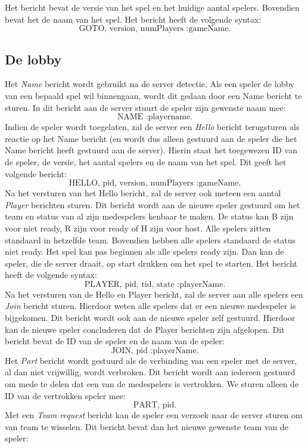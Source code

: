 \documentclass[a4paper,11pt]{article}
\begin{document}
    Het bericht bevat de versie van het spel en het huidige aantal spelers. Bovendien bevat het de naam van het spel. Het bericht heeft de volgende syntax:
    \[
    \text{GOTO, version, numPlayers :gameName.}
    \]

    \subsection{De lobby}
    Het \emph{Name} bericht wordt gebruikt na de server detectie. Als een speler de lobby van een bepaald spel wil binnengaan, wordt dit gedaan door een Name bericht te sturen. In dit bericht aan de server stuurt de speler zijn gewenste naam mee:
    \[
    \text{NAME :playername.}
    \]
    Indien de speler wordt toegelaten, zal de server een \emph{Hello} bericht terugsturen als reactie op het Name bericht (en wordt dus alleen gestuurd aan de speler die het Name bericht heeft gestuurd aan de server). Hierin staat het toegewezen ID van de speler, de versie, het aantal spelers en de naam van het spel. Dit geeft het volgende bericht:
    \[
    \text{HELLO, pid, version, numPlayers :gameName.}
    \]
    Na het versturen van het Hello bericht, zal de server ook meteen een aantal \emph{Player} berichten sturen. Dit bericht wordt aan de nieuwe speler gestuurd om het team en status van al zijn medespelers kenbaar te maken. De status kan B zijn voor niet ready, R zijn voor ready of H zijn voor host. Alle spelers zitten standaard in hetzelfde team. Bovendien hebben alle spelers standaard de status niet ready. Het spel kan pas beginnen als alle spelers ready zijn. Dan kan de speler, die de server draait, op start drukken om het spel te starten. Het bericht heeft de volgende syntax:
    \[
    \text{PLAYER, pid, tid, state :playerName.}
    \]
    Na het versturen van de Hello en Player bericht, zal de server aan alle spelers een \emph{Join} bericht sturen. Hierdoor weten alle spelers dat er een nieuwe medespeler is bijgekomen. Dit bericht wordt ook aan de nieuwe speler zelf gestuurd. Hierdoor kan de nieuwe speler concluderen dat de Player berichten zijn afgelopen. Dit bericht bevat de ID van de speler en de naam van de speler:
    \[
    \text{JOIN, pid :playerName.}
    \]
    Het \emph{Part} bericht wordt gestuurd als de verbinding van een speler met de server, al dan niet vrijwillig, wordt verbroken. Dit bericht wordt aan iedereen gestuurd om mede te delen dat een van de medespelers is vertrokken. We sturen alleen de ID van de vertrokken speler mee:
    \[
    \text{PART, pid.}
    \]
    Met een \emph{Team request} bericht kan de speler een verzoek naar de server sturen om van team te wisselen. Dit bericht bevat dan het nieuwe gewenste team van de speler:
\end{document}
